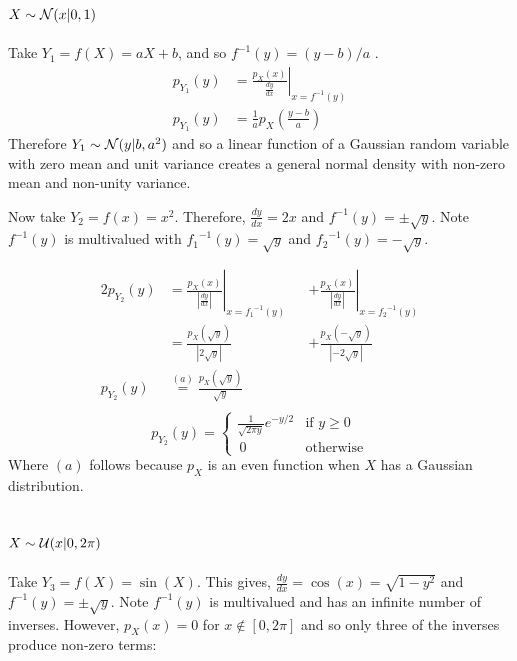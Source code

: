 \documentclass[12pt]{article}
\begin{document}
\subsection{$X \sim {\cal N}(x|0,1)$}

Take ${Y_1} = f(X) = aX + b$, and so $f^{-1}(y) = (y - b) / a$ .
\begin{align}
p_{Y_1}(y) &= \left. \frac {p_X(x)} {\frac {dy} {dx}} \right|_{x = f^ {-1} (y)} \nonumber \\
p_{Y_1}(y) &= \frac 1 a  {p_X \left (\frac {y - b} a \right)}
\end{align}
Therefore $Y_1 \sim {\cal N}(y|b, a^2)$ and so a linear function of a Gaussian random variable with zero mean and unit variance creates a general normal density with non-zero mean and non-unity variance.

Now take $Y_2 = f(x)=x^2$. Therefore, $\frac{dy}{dx} = 2x$  and $f^{-1}(y) = \pm \sqrt{y}$. Note $f^{-1}(y)$ is multivalued with ${f_1}^{-1}(y) = \sqrt{y}$ and ${f_2}^{-1}(y) = -\sqrt{y}$.

\begin{alignat*}{2}
  p_{Y_2}(y)  
  &= \left. \frac {p_X(x)} {\left| \frac {dy} {dx} \right|} \right|_{x = {f_1} ^ {-1} (y)}
  && + \left. \frac {p_X (x)} {\left| \frac {dy} {dx} \right|} \right|_{x = {f_2} ^ {-1} (y)} \\
  &= \frac {p_X ( \sqrt y )} {\left| 2 \sqrt y \right|}  && + \frac {p_X (- \sqrt y)} {\left| - 2 \sqrt y \right|} \\
  p_{Y_2}(y) &\stackrel {(a)} {=} \frac {p_X (\sqrt y)} {\sqrt y} \\    
\end{alignat*}
\begin{equation}
  p_{Y_2}(y) = 
  \begin{cases} 
    \frac 1 {\sqrt{2 \pi y}} e ^ { - y /2} &\mbox{if } y \ge 0 \\
    \, 0 &\mbox{otherwise}
  \end{cases}
\end{equation}
Where $(a)$ follows because $p_X$ is an even function when $X$ has a Gaussian distribution.

\subsection{$X \sim {\cal U}(x|0, 2\pi)$}

Take $Y_3 = f(X) = \sin(X)$. This gives, $\frac{dy}{dx} = \cos(x) = \sqrt{1 - y^2}$  and $f^{-1}(y) = \pm \sqrt{y}$. Note $f^{-1}(y)$ is multivalued and has an infinite number of inverses. However, $p_X(x) = 0$ for $x \not\in [0, 2\pi]$ and so only three of the inverses produce non-zero terms: 
\end{document}
